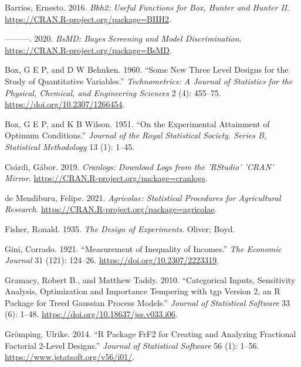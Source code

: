 \documentclass{article}
\newlength{\cslhangindent}
\newlength{\cslentryspacingunit} %
\newenvironment{CSLReferences}[2] %
 {%
  \setlength{\parindent}{0pt}
  \ifodd #1
  \let\oldpar\par
  \def\par{\hangindent=\cslhangindent\oldpar}
  \fi
  \setlength{\parskip}{#2\cslentryspacingunit}
 }%
 {}
\begin{document}
\hypertarget{refs}{}
\begin{CSLReferences}{1}{0}
\leavevmode{}%
Barrios, Ernesto. 2016. \emph{Bhh2: Useful Functions for Box, Hunter and
Hunter II}. \url{https://CRAN.R-project.org/package=BHH2}.

\leavevmode{}%
---------. 2020. \emph{BsMD: Bayes Screening and Model Discrimination}.
\url{https://CRAN.R-project.org/package=BsMD}.

\leavevmode{}%
Box, G E P, and D W Behnken. 1960. {``Some New Three Level Designs for
the Study of Quantitative Variables.''} \emph{Technometrics: A Journal
of Statistics for the Physical, Chemical, and Engineering Sciences} 2
(4): 455--75. \url{https://doi.org/10.2307/1266454}.

\leavevmode{}%
Box, G E P, and K B Wilson. 1951. {``On the Experimental Attainment of
Optimum Conditions.''} \emph{Journal of the Royal Statistical Society.
Series B, Statistical Methodology} 13 (1): 1--45.

\leavevmode{}%
Csárdi, Gábor. 2019. \emph{Cranlogs: Download Logs from the 'RStudio'
'CRAN' Mirror}. \url{https://CRAN.R-project.org/package=cranlogs}.

\leavevmode{}%
de Mendiburu, Felipe. 2021. \emph{Agricolae: Statistical Procedures for
Agricultural Research}.
\url{https://CRAN.R-project.org/package=agricolae}.

\leavevmode{}%
Fisher, Ronald. 1935. \emph{The Design of Experiments}. Oliver; Boyd.

\leavevmode{}%
Gini, Corrado. 1921. {``Measurement of Inequality of Incomes.''}
\emph{The Economic Journal} 31 (121): 124--26.
\url{https://doi.org/10.2307/2223319}.

\leavevmode{}%
Gramacy, Robert B., and Matthew Taddy. 2010. {``Categorical Inputs,
Sensitivity Analysis, Optimization and Importance Tempering with {tgp}
Version 2, an {R} Package for Treed Gaussian Process Models.''}
\emph{Journal of Statistical Software} 33 (6): 1--48.
\url{https://doi.org/10.18637/jss.v033.i06}.

\leavevmode{}%
Grömping, Ulrike. 2014. {``{R} Package {FrF2} for Creating and Analyzing
Fractional Factorial 2-Level Designs.''} \emph{Journal of Statistical
Software} 56 (1): 1--56. \url{https://www.jstatsoft.org/v56/i01/}.


\end{CSLReferences}
\end{document}
